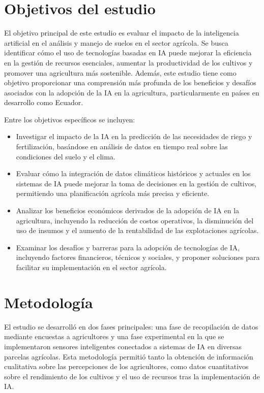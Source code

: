\documentclass[9pt,twocolumn,twoside]{opticajnl}
\begin{document}
\section{Objetivos del estudio}
El objetivo principal de este estudio es evaluar el impacto de la inteligencia artificial en el análisis y manejo de suelos en el sector agrícola. Se busca identificar cómo el uso de tecnologías basadas en IA puede mejorar la eficiencia en la gestión de recursos esenciales, aumentar la productividad de los cultivos y promover una agricultura más sostenible. Además, este estudio tiene como objetivo proporcionar una comprensión más profunda de los beneficios y desafíos asociados con la adopción de la IA en la agricultura, particularmente en países en desarrollo como Ecuador.

Entre los objetivos específicos se incluyen:
\begin{itemize}
    \item Investigar el impacto de la IA en la predicción de las necesidades de riego y fertilización, basándose en análisis de datos en tiempo real sobre las condiciones del suelo y el clima.
    \item Evaluar cómo la integración de datos climáticos históricos y actuales en los sistemas de IA puede mejorar la toma de decisiones en la gestión de cultivos, permitiendo una planificación agrícola más precisa y eficiente.
    \item Analizar los beneficios económicos derivados de la adopción de IA en la agricultura, incluyendo la reducción de costos operativos, la disminución del uso de insumos y el aumento de la rentabilidad de las explotaciones agrícolas.
    \item Examinar los desafíos y barreras para la adopción de tecnologías de IA, incluyendo factores financieros, técnicos y sociales, y proponer soluciones para facilitar su implementación en el sector agrícola.
\end{itemize}

\section{Metodología}
El estudio se desarrolló en dos fases principales: una fase de recopilación de datos mediante encuestas a agricultores y una fase experimental en la que se implementaron sensores inteligentes conectados a sistemas de IA en diversas parcelas agrícolas. Esta metodología permitió tanto la obtención de información cualitativa sobre las percepciones de los agricultores, como datos cuantitativos sobre el rendimiento de los cultivos y el uso de recursos tras la implementación de IA.
\end{document}
